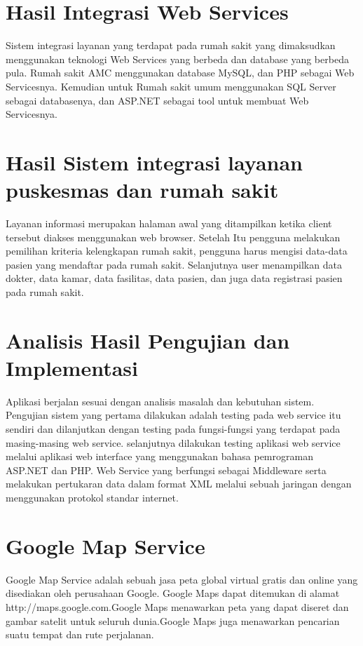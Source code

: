 \section{Hasil Integrasi Web Services}
Sistem integrasi  layanan yang terdapat pada rumah sakit yang dimaksudkan menggunakan teknologi Web Services 
yang berbeda dan database yang berbeda pula. Rumah sakit AMC menggunakan database MySQL, dan PHP sebagai Web Servicesnya.
Kemudian untuk Rumah sakit umum menggunakan SQL Server sebagai databasenya, dan ASP.NET sebagai tool untuk membuat Web Servicesnya.


\section{Hasil Sistem integrasi  layanan puskesmas dan rumah sakit}
Layanan informasi merupakan halaman awal yang ditampilkan ketika client tersebut diakses menggunakan web browser. 
Setelah Itu pengguna melakukan pemilihan kriteria kelengkapan rumah sakit, pengguna harus mengisi data-data pasien yang mendaftar pada rumah sakit. Selanjutnya user  menampilkan data dokter, data kamar, data fasilitas, data pasien, dan juga data registrasi pasien pada rumah sakit.


\section{Analisis Hasil Pengujian dan Implementasi}
Aplikasi berjalan sesuai dengan analisis masalah dan kebutuhan sistem.
Pengujian sistem yang pertama dilakukan adalah testing pada web service itu sendiri 
dan dilanjutkan dengan testing pada fungsi-fungsi  yang terdapat pada masing-masing web service. 
selanjutnya dilakukan testing aplikasi web service melalui aplikasi web interface yang menggunakan bahasa pemrograman ASP.NET dan PHP.
Web Service yang berfungsi sebagai Middleware serta melakukan pertukaran data dalam format XML melalui sebuah jaringan dengan menggunakan protokol standar internet.


\section {Google Map Service}
Google Map Service adalah sebuah jasa peta global virtual gratis dan online yang
disediakan oleh perusahaan Google. Google Maps dapat ditemukan di alamat
http://maps.google.com.Google Maps menawarkan peta yang dapat diseret dan gambar
satelit untuk seluruh dunia.Google Maps juga menawarkan pencarian suatu tempat dan
rute perjalanan.
